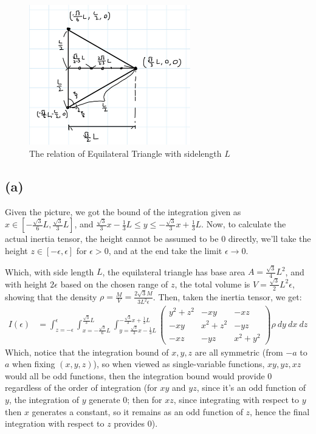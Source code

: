 \documentclass{article}
\begin{document}
\begin{figure}[h!]
    \begin{center}
        \includegraphics[width=70mm]{phys103_q2.jpg}
        \caption{The relation of Equilateral Triangle with sidelength $L$}
    \end{center}
\end{figure}

\subsection*{(a)}
Given the picture, we got the bound of the integration given as $x\in [-\frac{\sqrt{3}}{6}L, \frac{\sqrt{3}}{3}L]$, and $\frac{\sqrt{3}}{3}x-\frac{1}{3}L\leq y\leq -\frac{\sqrt{3}}{3}x+\frac{1}{3}L$. Now, to calculate the actual inertia tensor,  the height cannot be assumed to be $0$ directly, we'll take the height $z\in [-\epsilon,\epsilon]$ for $\epsilon>0$, and at the end take the limit $\epsilon\rightarrow 0$. 

Which, with side length $L$, the equilateral triangle has base area $A=\frac{\sqrt{3}}{4}L^2$, and with height $2\epsilon$ based on the chosen range of $z$, the total volume is $V=\frac{\sqrt{3}}{2}L^2\epsilon$, showing that the density $\rho = \frac{M}{V}=\frac{2\sqrt{3}M}{3L^2\epsilon}$. Then, taken the inertia tensor, we get:
\begin{align}
    I(\epsilon) &= \int_{z=-\epsilon}^{\epsilon}\int_{x=-\frac{\sqrt{3}}{6}L}^{\frac{\sqrt{3}}{3}L}\int_{y=\frac{\sqrt{3}}{3}x-\frac{1}{3}L}^{-\frac{\sqrt{3}}{3}x+\frac{1}{3}L} \begin{pmatrix}
        y^2+z^2 & -xy & -xz\\
        -xy & x^2+z^2 & -yz\\
        -xz & -yz & x^2+y^2
    \end{pmatrix}\rho\ dy\ dx\ dz
\end{align}
Which, notice that the integration bound of $x,y,z$ are all symmetric (from $-a$ to $a$ when fixing $(x,y,z)$), so when viewed as single-variable functions, $xy,yz,xz$ would all be odd functions, then the integration bound would provide $0$ regardless of the order of integration (for $xy$ and $yz$, since it's an odd function of $y$, the integration of $y$ generate $0$; then for $xz$, since integrating with respect to $y$ then $x$ generates a constant, so it remains as an odd function of $z$, hence the final integration with respect to $z$ provides $0$). 
\end{document}

